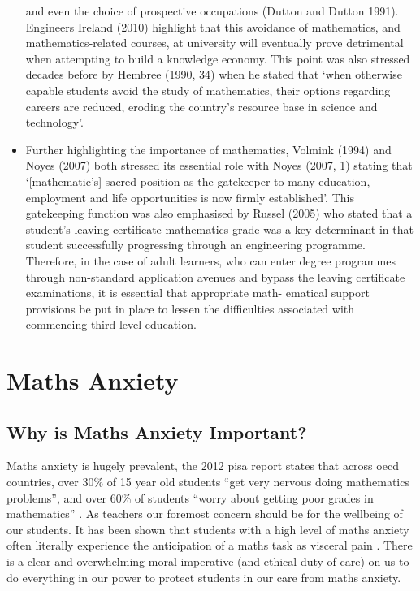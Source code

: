 \documentclass[twoside,12pt,a4paper]{report}
\begin{document}
\begin{itemize}
and even the choice of prospective occupations (Dutton and Dutton 1991). Engineers
Ireland (2010) highlight that this avoidance of mathematics, and mathematics-related
courses, at university will eventually prove detrimental when attempting to build a
knowledge economy. This point was also stressed decades before by Hembree
(1990, 34) when he stated that ‘when otherwise capable students avoid the study of
mathematics, their options regarding careers are reduced, eroding the country’s
resource base in science and technology’.
	\item Further highlighting the importance of mathematics, Volmink (1994) and
Noyes (2007) both stressed its essential role with Noyes (2007, 1) stating that
‘[mathematic’s] sacred position as the gatekeeper to many education, employment
and life opportunities is now firmly established’. This gatekeeping function was
also emphasised by Russel (2005) who stated that a student’s leaving certificate
mathematics grade was a key determinant in that student successfully progressing
through an engineering programme. Therefore, in the case of adult learners, who
can enter degree programmes through non-standard application avenues and
bypass the leaving certificate examinations, it is essential that appropriate math-
ematical support provisions be put in place to lessen the difficulties associated
with commencing third-level education.
\end{itemize}





\section{Maths Anxiety}


\subsection*{Why is Maths Anxiety Important?}

Maths anxiety is hugely prevalent, the 2012 \gls{pisa} report states that across \gls{oecd} countries, over 30\% of 15 year old students ``get very nervous doing mathematics problems'', and over 60\% of students ``worry about getting poor grades in mathematics''  \cite{PISA2013}. As teachers our foremost concern should be for the wellbeing of our students. It has been shown that students with a high level of maths anxiety often literally experience the anticipation of a maths task as visceral pain \cite{Lyons2012pain}. There is a clear and overwhelming moral imperative (and ethical duty of care) on us to do everything in our power to protect students in our care from maths anxiety.
\end{document}
